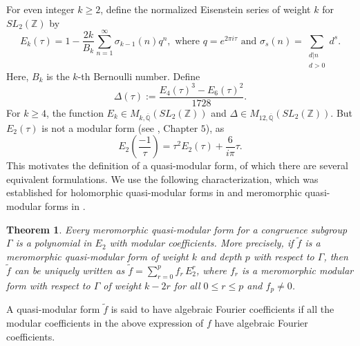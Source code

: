 \documentclass[11pt, reqno]{amsart}
\newtheorem{theorem}{Theorem}[section]
\begin{document}
For even integer $k\geq 2$, define the normalized Eisenstein series of weight $k$ for $S L_2(\mathbb{Z})$ by
$$
E_{k}(\tau) = 1-\frac{2 k}{B_{k}} \sum_{n=1}^{\infty} \sigma_{k-1}(n) q^{n}, \text{   where }q=e^{2\pi i\tau} \text{ and } \sigma_s(n)=\sum_{\substack{d|n\\ d>0}}d^s.
$$ 
Here, $B_k$ is the $k$-th Bernoulli number. Define
\begin{equation*}
    \Delta(\tau):=\frac{E_4(\tau)^3-E_6(\tau)^2}{1728}.
\end{equation*}
For $k\geq 4$, the function $E_k\in M_{k,\overline{\mathbb{Q}}}(S L_2(\mathbb{Z}))$ and $\Delta \in M_{12,\overline{\mathbb{Q}}}(S L_2(\mathbb{Z}))$. But $E_2(\tau)$ is not a modular form (see \cite{murty-dewar-graves}, Chapter $5$), as
\begin{equation*}
    E_2 \left( \frac{-1}{\tau} \right) = {\tau}^2 E_2(\tau) + \frac{6}{i\pi} \tau.
\end{equation*}
This motivates the definition of a quasi-modular form, of which there are several equivalent formulations. We use the following characterization, which was established for holomorphic quasi-modular forms in \cite[Proposition 20]{1-2-3} and meromorphic quasi-modular forms in \cite[Theorem 4.2]{wang-zhang}.
\begin{theorem}\label{quasistructure}
Every meromorphic quasi-modular form for a congruence subgroup $\Gamma$ is a polynomial in $E_2$ with modular coefficients. More precisely, if $\widetilde{f}$ is a meromorphic quasi-modular form of weight $k$ and depth $p$ with respect to $\Gamma$, then $\widetilde{f}$ can be uniquely written as $\widetilde{f} = \sum_{r=0}^p  f_r\, E_2^r$, where $f_r$ is a meromorphic modular form with respect to $\Gamma$ of weight $k-2r$ for all $0\leq r\leq p$ and $f_p\neq 0$. 
\end{theorem}
A quasi-modular form $\widetilde{f}$ is said to have algebraic Fourier coefficients if all the modular coefficients in the above expression of $f$ have algebraic Fourier coefficients. \\
\end{document}
